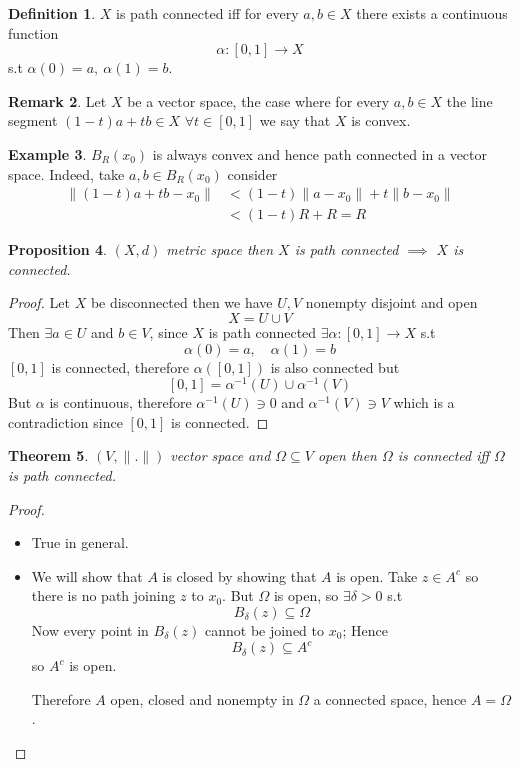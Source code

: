 \documentclass[11pt,a4paper]{article}
\theoremstyle{definition}
\newtheorem{definition}{Definition}[section]
\newtheorem{example}[definition]{Example}
\newtheorem{remark}[definition]{Remark}
\theoremstyle{plain}
\newtheorem{theorem}[definition]{Theorem}
\newtheorem{proposition}[definition]{Proposition}
\theoremstyle{remark}
\newcommand{\norm}[1]{\lVert #1 \rVert}
\begin{document}
\begin{definition}
    $X$ is path connected iff for every $a, b \in X$ there exists a continuous function 
    $$\alpha \colon [0,1] \to X$$ 
    s.t $\alpha(0) = a, \ \alpha(1) = b$. 
\end{definition}

\begin{remark}
    Let $X$ be a vector space, the case where for every $a, b \in X$ the line segment $(1-t)a + tb \in X$ $\forall t \in [0,1]$ we say that $X$ is convex. 
\end{remark}

\begin{example}
    $B_R(x_0)$ is always convex and hence path connected in a vector space. Indeed, take $a, b \in B_R(x_0)$ consider 
    \begin{align*}
        \norm{(1-t) a + tb -x_0} &< (1-t)\norm{a - x_0} + t \norm{b - x_0} \\
        &< (1-t) R + R = R
    \end{align*}
\end{example}

\begin{proposition}
    $(X,d)$ metric space then $X$ is path connected $\implies$ $X$ is connected. 
\end{proposition}

\begin{proof}
    Let $X$ be disconnected then we have $U,V$ nonempty disjoint and open
    $$X = U \cup V$$
    Then $\exists a \in U$ and $b \in V$, since $X$ is path connected $\exists \alpha \colon [0,1] \to X$ s.t 
    $$\alpha(0) = a, \quad \alpha(1) = b$$
    $[0,1]$ is connected, therefore $\alpha([0,1])$ is also connected but 
    $$[0,1] = \alpha^{-1} (U) \cup \alpha^{-1} (V)$$
    But $\alpha$ is continuous, therefore $\alpha^{-1} (U) \ni 0$ and $\alpha^{-1} (V) \ni V$ which is a contradiction since $[0,1]$ is connected.  
\end{proof}

\begin{theorem}
    $(V, \norm{.})$ vector space and $\Omega \subseteq V$ open then $\Omega$ is connected iff $\Omega$ is path connected. 
\end{theorem}

\begin{proof}
    \begin{itemize}
        \item[$\impliedby$] True in general.
        \item[$\implies$] We will show that $A$ is closed by showing that $A$ is open. Take $z \in A^c$ so there is no path joining $z$ to $x_0$. 
        But $\Omega$ is open, so $\exists \delta > 0$ s.t 
        $$B_\delta (z) \subseteq \Omega$$
        Now every point in $B_\delta(z)$ cannot be joined to $x_0$; Hence
        $$B_\delta(z) \subseteq A^c$$
        so $A^c$ is open. 

        Therefore $A$ open, closed and nonempty in $\Omega$ a connected space, hence $A = \Omega$.
    \end{itemize}
\end{proof}
\end{document}

